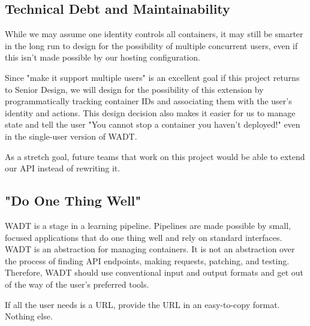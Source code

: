\documentclass[12pt]{article}
\begin{document}
\subsection{Technical Debt and Maintainability}
While we may assume one identity controls all containers, it may still be smarter in the long run to design for the possibility of multiple concurrent users, even if this isn't made possible by our hosting configuration.

Since "make it support multiple users" is an excellent goal if this project returns to Senior Design, we will design for the possibility of this extension by programmatically tracking container IDs and associating them with the user's identity and actions. This design decision also makes it easier for us to manage state and tell the user "You cannot stop a container you haven't deployed!" even in the single-user version of WADT.

As a stretch goal, future teams that work on this project would be able to extend our API instead of rewriting it.

\subsection{"Do One Thing Well"}
WADT is a stage in a learning pipeline. Pipelines are made possible by small, focused applications that do one thing well and rely on standard interfaces. WADT is an abstraction for managing containers. It is not an abstraction over the process of finding API endpoints, making requests, patching, and testing. Therefore, WADT should use conventional input and output formats and get out of the way of the user's preferred tools.

If all the user needs is a URL, provide the URL in an easy-to-copy format. Nothing else.
\end{document}
